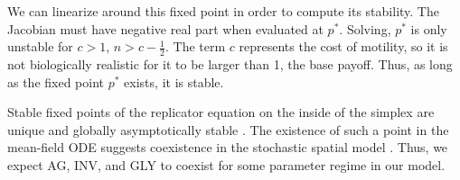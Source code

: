 \documentclass[12pt]{amsart}
\begin{document}
We can linearize around this fixed point in order to compute its stability. The Jacobian must have negative real part when evaluated at $p^*$. Solving, $p^*$ is only unstable for $c > 1$, $n > c - \frac{1}{2}$. The term $c$ represents the cost of motility, so it is not biologically realistic for it to be larger than 1, the base payoff. Thus, as long as the fixed point $p^*$ exists, it is stable.

Stable fixed points of the replicator equation on the inside of the simplex are unique and globally asymptotically stable \cite{Hofbauer1998}. The existence of such a point in the mean-field ODE suggests coexistence in the stochastic spatial model \cite{Durrett2009}. Thus, we expect AG, INV, and GLY to coexist for some parameter regime in our model.


\begin{figure}[ht]


\end{figure}
\end{document}

